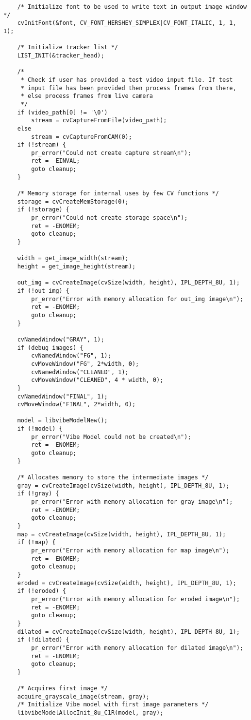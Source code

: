 \begin{lstlisting}
	/* Initialize font to be used to write text in output image window */
	cvInitFont(&font, CV_FONT_HERSHEY_SIMPLEX|CV_FONT_ITALIC, 1, 1, 1);

	/* Initialize tracker list */
	LIST_INIT(&tracker_head);

	/*
	 * Check if user has provided a test video input file. If test
	 * input file has been provided then process frames from there,
	 * else process frames from live camera
	 */
	if (video_path[0] != '\0')
		stream = cvCaptureFromFile(video_path);
	else
		stream = cvCaptureFromCAM(0);
	if (!stream) {
		pr_error("Could not create capture stream\n");
		ret = -EINVAL;
		goto cleanup;
	}

	/* Memory storage for internal uses by few CV functions */
	storage = cvCreateMemStorage(0);
	if (!storage) {
		pr_error("Could not create storage space\n");
		ret = -ENOMEM;
		goto cleanup;
	}

	width = get_image_width(stream);
	height = get_image_height(stream);

	out_img = cvCreateImage(cvSize(width, height), IPL_DEPTH_8U, 1);
	if (!out_img) {
		pr_error("Error with memory allocation for out_img image\n");
		ret = -ENOMEM;
		goto cleanup;
	}

	cvNamedWindow("GRAY", 1);
	if (debug_images) {
		cvNamedWindow("FG", 1);
		cvMoveWindow("FG", 2*width, 0);
		cvNamedWindow("CLEANED", 1);
		cvMoveWindow("CLEANED", 4 * width, 0);
	}
	cvNamedWindow("FINAL", 1);
	cvMoveWindow("FINAL", 2*width, 0);

	model = libvibeModelNew();
	if (!model) {
		pr_error("Vibe Model could not be created\n");
		ret = -ENOMEM;
		goto cleanup;
	}

	/* Allocates memory to store the intermediate images */
	gray = cvCreateImage(cvSize(width, height), IPL_DEPTH_8U, 1);
	if (!gray) {
		pr_error("Error with memory allocation for gray image\n");
		ret = -ENOMEM;
		goto cleanup;
	}
	map = cvCreateImage(cvSize(width, height), IPL_DEPTH_8U, 1);
	if (!map) {
		pr_error("Error with memory allocation for map image\n");
		ret = -ENOMEM;
		goto cleanup;
	}
	eroded = cvCreateImage(cvSize(width, height), IPL_DEPTH_8U, 1);
	if (!eroded) {
		pr_error("Error with memory allocation for eroded image\n");
		ret = -ENOMEM;
		goto cleanup;
	}
	dilated = cvCreateImage(cvSize(width, height), IPL_DEPTH_8U, 1);
	if (!dilated) {
		pr_error("Error with memory allocation for dilated image\n");
		ret = -ENOMEM;
		goto cleanup;
	}

	/* Acquires first image */
	acquire_grayscale_image(stream, gray);
	/* Initialize Vibe model with first image parameters */
	libvibeModelAllocInit_8u_C1R(model, gray);


\end{lstlisting}
